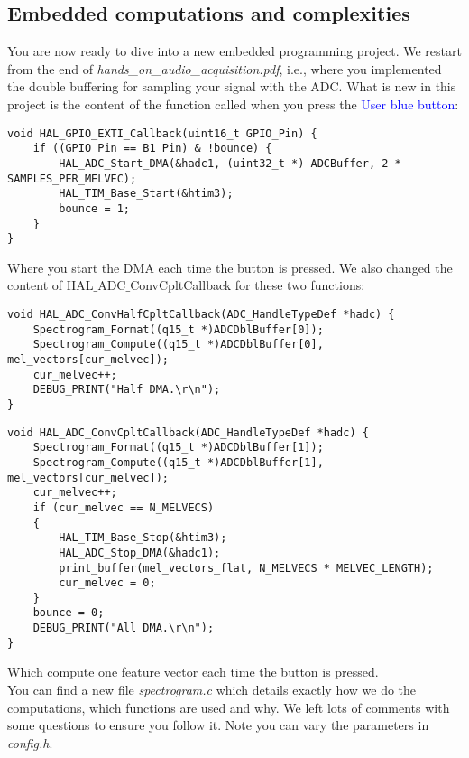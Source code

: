 \subsection{Embedded computations and complexities}
%
You are now ready to dive into a new embedded programming project.
We restart from the end of \emph{hands\_on\_audio\_acquisition.pdf}, i.e., where you implemented the double buffering for sampling your signal with the ADC. What is new in this project is the content of the function called when you press the \textcolor{blue}{User blue button}: \\
%
\begin{lstlisting}
void HAL_GPIO_EXTI_Callback(uint16_t GPIO_Pin) {
	if ((GPIO_Pin == B1_Pin) & !bounce) {
		HAL_ADC_Start_DMA(&hadc1, (uint32_t *) ADCBuffer, 2 * SAMPLES_PER_MELVEC);
		HAL_TIM_Base_Start(&htim3);
		bounce = 1;
	}
}
\end{lstlisting}
%
Where you start the DMA each time the button is pressed. We also changed the content of \newline HAL$\_$ADC$\_$ConvCpltCallback for these two functions:
%
\begin{lstlisting}
void HAL_ADC_ConvHalfCpltCallback(ADC_HandleTypeDef *hadc) {
	Spectrogram_Format((q15_t *)ADCDblBuffer[0]);
	Spectrogram_Compute((q15_t *)ADCDblBuffer[0], mel_vectors[cur_melvec]);
	cur_melvec++;
	DEBUG_PRINT("Half DMA.\r\n");
}
\end{lstlisting}
\begin{lstlisting}
void HAL_ADC_ConvCpltCallback(ADC_HandleTypeDef *hadc) {
	Spectrogram_Format((q15_t *)ADCDblBuffer[1]);
	Spectrogram_Compute((q15_t *)ADCDblBuffer[1], mel_vectors[cur_melvec]);
	cur_melvec++;
	if (cur_melvec == N_MELVECS)
	{
		HAL_TIM_Base_Stop(&htim3);
		HAL_ADC_Stop_DMA(&hadc1);
		print_buffer(mel_vectors_flat, N_MELVECS * MELVEC_LENGTH);
		cur_melvec = 0;
	}
	bounce = 0;
	DEBUG_PRINT("All DMA.\r\n");
}
\end{lstlisting}
%
Which compute one feature vector each time the button is pressed. \\
You can find a new file \emph{spectrogram.c} which details exactly how we do the computations, which functions are used and why. We left lots of comments with some questions to ensure you follow it. Note you can vary the parameters in \emph{config.h}. \\
\\

